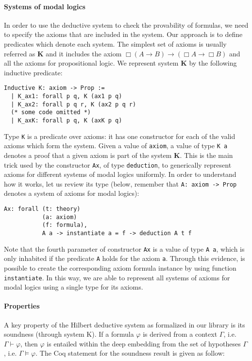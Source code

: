 \documentclass[sigconf]{acmart}
\begin{document}
\paragraph{Systems of modal logics} In order to use the deductive system to
check the provability of formulas, we need to specify the axioms that are
included in the system. Our approach is to define predicates
which denote each system. The simplest set of axioms is usually referred as
\textbf{K} and it includes the axiom $\Box(A \to B) \to (\Box A \to \Box B)$
and all the axioms for propositional logic. We represent system \textbf{K}
by the following inductive predicate:
\begin{verbatim}
Inductive K: axiom -> Prop :=
  | K_ax1: forall p q, K (ax1 p q)
  | K_ax2: forall p q r, K (ax2 p q r)
  (* some code omitted *)
  | K_axK: forall p q, K (axK p q)
\end{verbatim}
Type \texttt{K} is a predicate over axioms: it has one constructor for
each of the valid axioms which form the system. Given a value
of \texttt{axiom}, a value of type \texttt{K a} denotes a
proof that a given axiom is part of the system \textbf{K}. This is the main
trick used by the constructor \texttt{Ax}, of type
\texttt{deduction}, to generically represent axioms for
different systems of modal logics uniformly. In order to understand how it
works, let us review its type (below, remember that \texttt{A: axiom -> Prop}
denotes a system of axioms for modal logics):
\begin{verbatim}
Ax: forall (t: theory)
           (a: axiom)
           (f: formula),
           A a -> instantiate a = f -> deduction A t f
\end{verbatim}
Note that the fourth parameter of constructor \texttt{Ax} is a value
of type \texttt{A a}, which is only inhabited if the predicate
\texttt{A} holds for the axiom \texttt{a}. Through this
evidence, is possible to create the corresponding axiom formula instance by
using function \texttt{instantiate}. In this way, we are able to
represent all systems of axioms for modal logics using a single type
for its axioms.

\paragraph{Properties} A key property of the Hilbert deductive system as formalized
in our library is its soundness (through system K). If a formula $\varphi$ is derived from a
context $\Gamma$, i.e. $\Gamma\vdash\varphi$, then $\varphi$ is entailed within the deep embedding
from the set of hypotheses $\Gamma$, i.e. $\Gamma\models\varphi$. The Coq statement for the soundness
result is given as follow:
\end{document}
